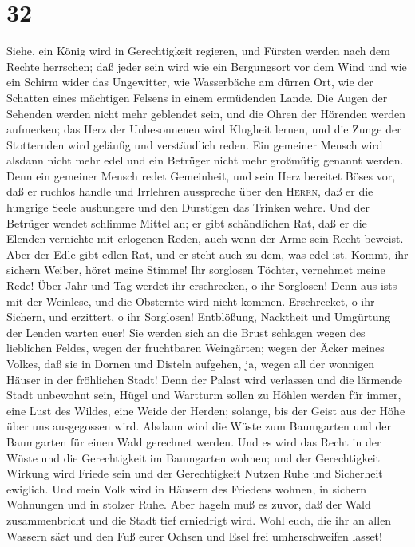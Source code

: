 \hypertarget{section-31}{%
\section{32}\label{section-31}}

 Siehe, ein König wird in Gerechtigkeit regieren, und
Fürsten werden nach dem Rechte herrschen;  daß jeder sein
wird wie ein Bergungsort vor dem Wind und wie ein Schirm wider das
Ungewitter, wie Wasserbäche am dürren Ort, wie der Schatten eines
mächtigen Felsens in einem ermüdenden Lande.  Die Augen
der Sehenden werden nicht mehr geblendet sein, und die Ohren der
Hörenden werden aufmerken;  das Herz der Unbesonnenen wird
Klugheit lernen, und die Zunge der Stotternden wird geläufig und
verständlich reden.  Ein gemeiner Mensch wird alsdann
nicht mehr edel und ein Betrüger nicht mehr großmütig genannt werden.
 Denn ein gemeiner Mensch redet Gemeinheit, und sein Herz
bereitet Böses vor, daß er ruchlos handle und Irrlehren ausspreche über
den \textsc{Herrn}, daß er die hungrige Seele aushungere und den
Durstigen das Trinken wehre.  Und der Betrüger wendet
schlimme Mittel an; er gibt schändlichen Rat, daß er die Elenden
vernichte mit erlogenen Reden, auch wenn der Arme sein Recht beweist.
 Aber der Edle gibt edlen Rat, und er steht auch zu dem,
was edel ist.  Kommt, ihr sichern Weiber, höret meine
Stimme! Ihr sorglosen Töchter, vernehmet meine Rede! 
Über Jahr und Tag werdet ihr erschrecken, o ihr Sorglosen! Denn aus
ist\textquotesingle s mit der Weinlese, und die Obsternte wird nicht
kommen.  Erschrecket, o ihr Sichern, und erzittert, o ihr
Sorglosen! Entblößung, Nacktheit und Umgürtung der Lenden warten euer!
 Sie werden sich an die Brust schlagen wegen des
lieblichen Feldes, wegen der fruchtbaren Weingärten; 
wegen der Äcker meines Volkes, daß sie in Dornen und Disteln aufgehen,
ja, wegen all der wonnigen Häuser in der fröhlichen Stadt!
 Denn der Palast wird verlassen und die lärmende Stadt
unbewohnt sein, Hügel und Wartturm sollen zu Höhlen werden für immer,
eine Lust des Wildes, eine Weide der Herden;  solange,
bis der Geist aus der Höhe über uns ausgegossen wird. Alsdann wird die
Wüste zum Baumgarten und der Baumgarten für einen Wald gerechnet werden.
 Und es wird das Recht in der Wüste und die Gerechtigkeit
im Baumgarten wohnen;  und der Gerechtigkeit Wirkung wird
Friede sein und der Gerechtigkeit Nutzen Ruhe und Sicherheit ewiglich.
 Und mein Volk wird in Häusern des Friedens wohnen, in
sichern Wohnungen und in stolzer Ruhe.  Aber hageln muß
es zuvor, daß der Wald zusammenbricht und die Stadt tief erniedrigt
wird.  Wohl euch, die ihr an allen Wassern säet und den
Fuß eurer Ochsen und Esel frei umherschweifen lasset!

